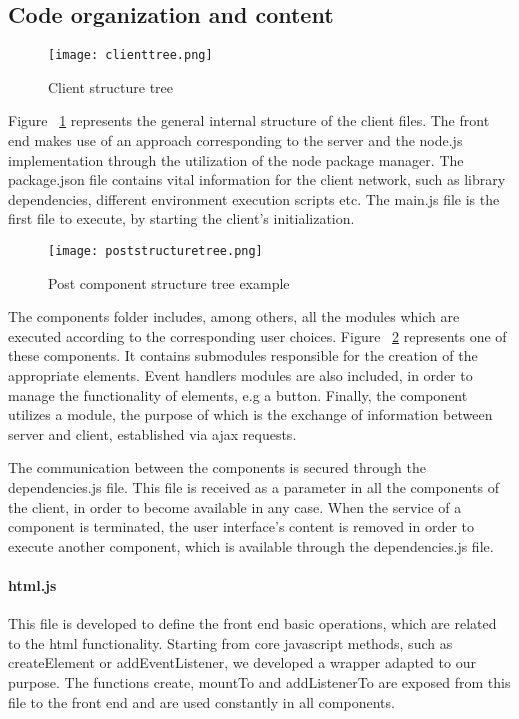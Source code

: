 \subsection{Code organization and content}
\begin{figure}
	\centerline{\texttt{[image: clienttree.png]}}
	\caption{Client structure tree}
	\label{clienttree}
\end{figure}
Figure ~\ref{clienttree} represents the general internal structure of the client files. The front end makes use of an approach corresponding to the server and the node.js implementation through the utilization of the node package manager. The package.json file contains vital information for the client network, such as library dependencies, different environment execution scripts etc. The main.js file is the first file to execute, by starting the client's initialization. \par 
\begin{figure}
	\centerline{\texttt{[image: poststructuretree.png]}}
	\caption{Post component structure tree example}
	\label{poststructuretree}
\end{figure}
	The components folder includes, among others, all the modules which are executed according to the corresponding user choices. Figure ~\ref{poststructuretree} represents one of these components. It contains submodules responsible for the creation of the appropriate elements. Event handlers modules are also included, in order to manage the functionality of elements, e.g a button. Finally, the component utilizes a module, the purpose of which is the exchange of information between server and client, established via ajax requests.\par
	The communication between the components is secured through the dependencies.js file. This file is received as a parameter in all the components of the client, in order to become available in any case. When the service of a component is terminated, the user interface's content is removed in order to execute another component, which is available through the dependencies.js file.

\paragraph{html.js}
This file is developed to define the front end basic operations, which are related to the html functionality. Starting from core javascript methods, such as createElement or addEventListener, we developed a wrapper adapted to our purpose. The functions create, mountTo and addListenerTo are exposed from this file to the front end and are used constantly in all components. 

